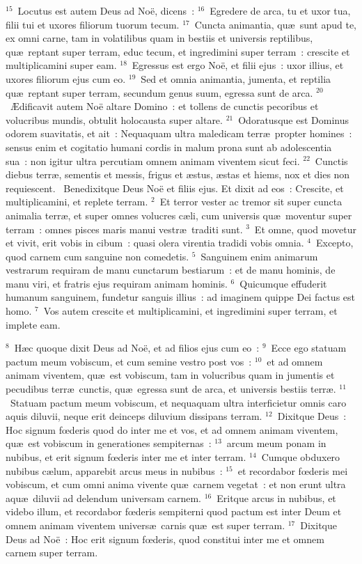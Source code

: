 ${}^{15}$~Locutus est autem Deus ad No\"e, dicens~:
${}^{16}$~Egredere de arca, tu et uxor tua, filii tui et uxores filiorum tuorum tecum.
${}^{17}$~Cuncta animantia, qu\ae\ sunt apud te, ex omni carne, tam in volatilibus quam in bestiis et universis reptilibus, qu\ae\ reptant super terram, educ tecum, et ingredimini super terram~: crescite et multiplicamini super eam.
${}^{18}$~Egressus est ergo No\"e, et filii ejus~: uxor illius, et uxores filiorum ejus cum eo.
${}^{19}$~Sed et omnia animantia, jumenta, et reptilia qu\ae\ reptant super terram, secundum genus suum, egressa sunt de arca.
${}^{20}$~\AE dificavit autem No\"e altare Domino~: et tollens de cunctis pecoribus et volucribus mundis, obtulit holocausta super altare.
${}^{21}$~Odoratusque est Dominus odorem suavitatis, et ait~: Nequaquam ultra maledicam terr\ae\ propter homines~: sensus enim et cogitatio humani cordis in malum prona sunt ab adolescentia sua~: non igitur ultra percutiam omnem animam viventem sicut feci.
${}^{22}$~Cunctis diebus terr\ae , sementis et messis, frigus et \ae stus, \ae stas et hiems, nox et dies non requiescent.
~Benedixitque Deus No\"e et filiis ejus. Et dixit ad eos~: Crescite, et multiplicamini, et replete terram.
${}^{2}$~Et terror vester ac tremor sit super cuncta animalia terr\ae , et super omnes volucres c\ae li, cum universis qu\ae\ moventur super terram~: omnes pisces maris manui vestr\ae\ traditi sunt.
${}^{3}$~Et omne, quod movetur et vivit, erit vobis in cibum~: quasi olera virentia tradidi vobis omnia.
${}^{4}$~Excepto, quod carnem cum sanguine non comedetis.
${}^{5}$~Sanguinem enim animarum vestrarum requiram de manu cunctarum bestiarum~: et de manu hominis, de manu viri, et fratris ejus requiram animam hominis.
${}^{6}$~Quicumque effuderit humanum sanguinem, fundetur sanguis illius~: ad imaginem quippe Dei factus est homo.
${}^{7}$~Vos autem crescite et multiplicamini, et ingredimini super terram, et implete eam.


${}^{8}$~H\ae c quoque dixit Deus ad No\"e, et ad filios ejus cum eo~:
${}^{9}$~Ecce ego statuam pactum meum vobiscum, et cum semine vestro post vos~:
${}^{10}$~et ad omnem animam viventem, qu\ae\ est vobiscum, tam in volucribus quam in jumentis et pecudibus terr\ae\ cunctis, qu\ae\ egressa sunt de arca, et universis bestiis terr\ae .
${}^{11}$~Statuam pactum meum vobiscum, et nequaquam ultra interficietur omnis caro aquis diluvii, neque erit deinceps diluvium dissipans terram.
${}^{12}$~Dixitque Deus~: Hoc signum fœderis quod do inter me et vos, et ad omnem animam viventem, qu\ae\ est vobiscum in generationes sempiternas~:
${}^{13}$~arcum meum ponam in nubibus, et erit signum fœderis inter me et inter terram.
${}^{14}$~Cumque obduxero nubibus c\ae lum, apparebit arcus meus in nubibus~:
${}^{15}$~et recordabor fœderis mei vobiscum, et cum omni anima vivente qu\ae\ carnem vegetat~: et non erunt ultra aqu\ae\ diluvii ad delendum universam carnem.
${}^{16}$~Eritque arcus in nubibus, et videbo illum, et recordabor fœderis sempiterni quod pactum est inter Deum et omnem animam viventem univers\ae\ carnis qu\ae\ est super terram.
${}^{17}$~Dixitque Deus ad No\"e~: Hoc erit signum fœderis, quod constitui inter me et omnem carnem super terram.


